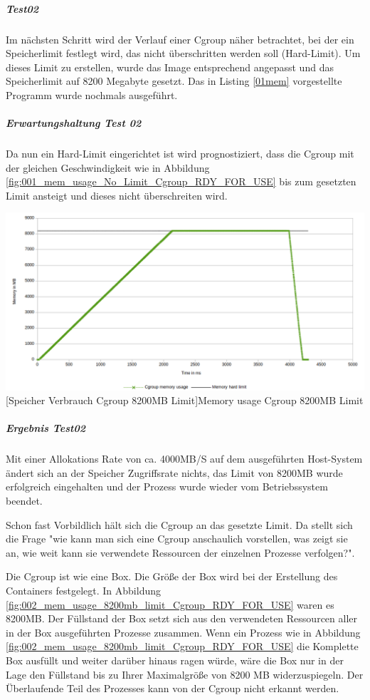 \subparagraph{Test02}
Im nächsten Schritt wird der Verlauf einer Cgroup näher betrachtet, bei der ein Speicherlimit festlegt wird, das nicht überschritten werden soll (Hard-Limit). Um dieses Limit zu erstellen, wurde das Image entsprechend angepasst und das Speicherlimit auf 8200 Megabyte gesetzt. Das in Listing \ref{01mem} vorgestellte Programm wurde nochmals ausgeführt.

\subparagraph{Erwartungshaltung Test 02}
Da nun ein Hard-Limit eingerichtet ist wird prognostiziert, dass die Cgroup mit der gleichen Geschwindigkeit wie in Abbildung \ref{fig:001_mem_usage_No_Limit_Cgroup_RDY_FOR_USE} bis zum gesetzten Limit ansteigt und dieses nicht überschreiten wird. 

\vspace{1em}
\begin{minipage}{\linewidth}
	\centering
	\includegraphics[width=1\linewidth]{pics/002_mem_usage_8200mb_limit_Cgroup_RDY_FOR_USE.png}
	[Speicher Verbrauch Cgroup 8200MB Limit]{Memory usage Cgroup 8200MB Limit}
	\label{fig:002_mem_usage_8200mb_limit_Cgroup_RDY_FOR_USE}
\end{minipage}

\subparagraph{Ergebnis Test02}
Mit einer Allokations Rate von ca. 4000MB/S auf dem ausgeführten Host-System ändert sich an der Speicher Zugriffsrate nichts, das Limit von 8200MB wurde erfolgreich eingehalten und der Prozess wurde wieder vom Betriebssystem beendet.

Schon fast Vorbildlich hält sich die Cgroup an das gesetzte Limit. Da stellt sich die Frage "wie kann man sich eine Cgroup anschaulich vorstellen, was zeigt sie an, wie weit kann sie verwendete Ressourcen der einzelnen Prozesse verfolgen?". 


Die Cgroup ist wie eine Box. Die Größe der Box wird bei der Erstellung des Containers festgelegt. In Abbildung \ref{fig:002_mem_usage_8200mb_limit_Cgroup_RDY_FOR_USE} waren es 8200MB. Der Füllstand der Box setzt sich aus den verwendeten Ressourcen aller in der Box ausgeführten Prozesse zusammen. Wenn ein Prozess wie in Abbildung \ref{fig:002_mem_usage_8200mb_limit_Cgroup_RDY_FOR_USE} die Komplette Box ausfüllt und weiter darüber hinaus ragen würde, wäre die Box nur in der Lage den Füllstand bis zu Ihrer Maximalgröße von 8200 MB widerzuspiegeln. Der Überlaufende Teil des Prozesses kann von der Cgroup nicht erkannt werden.

